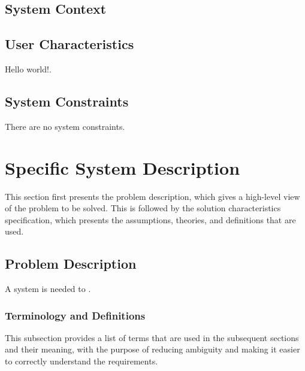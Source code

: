 \documentclass[12pt]{article}
\begin{document}
\subsection{System Context}
\label{Sec:SysContext}
\subsection{User Characteristics}
\label{Sec:UserChars}
Hello world!.

\subsection{System Constraints}
\label{Sec:SysConstraints}
There are no system constraints.

\section{Specific System Description}
\label{Sec:SpecSystDesc}
This section first presents the problem description, which gives a high-level view of the problem to be solved. This is followed by the solution characteristics specification, which presents the assumptions, theories, and definitions that are used.

\subsection{Problem Description}
\label{Sec:ProbDesc}
A system is needed to .

\subsubsection{Terminology and Definitions}
\label{Sec:TermDefs}
This subsection provides a list of terms that are used in the subsequent sections and their meaning, with the purpose of reducing ambiguity and making it easier to correctly understand the requirements.
\end{document}
